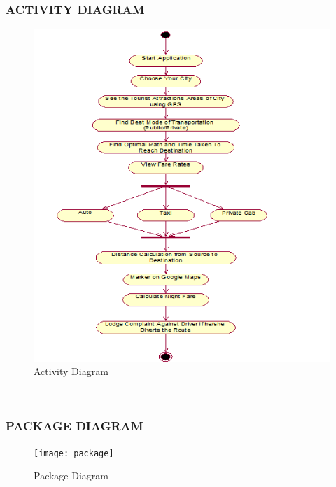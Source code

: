 \documentclass[12pt,a4paper]{article}
\begin{document}
\subsubsection{ACTIVITY DIAGRAM}
\begin{figure}[!htb]
\centering
\includegraphics[width=15 cm]{activity}
\caption{Activity Diagram}
\end{figure}
\\
\newpage
\subsubsection{PACKAGE DIAGRAM}
\begin{figure}[!htb]
\centering
\texttt{[image: package]}
\caption{Package Diagram}
\end{figure}
\\
\newpage
\end{document}
